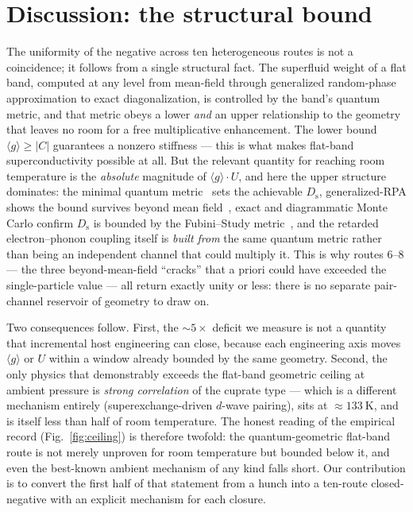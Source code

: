 \documentclass[11pt,a4paper]{article}
\newcommand{\qgg}{\langle g \rangle}
\newcommand{\Ds}{D_{\mathrm{s}}}
\begin{document}
\section{Discussion: the structural bound}
\label{sec:disc}
The uniformity of the negative across ten heterogeneous routes is not a coincidence; it follows from
a single structural fact. The superfluid weight of a flat band, computed at any level from
mean-field through generalized random-phase approximation to exact diagonalization, is controlled by
the band's quantum metric, and that metric obeys a lower \emph{and} an upper relationship to the
geometry that leaves no room for a free multiplicative enhancement. The lower bound
$\qgg \ge |C|$ guarantees a nonzero stiffness --- this is what makes flat-band superconductivity
possible at all. But the relevant quantity for reaching room temperature is the \emph{absolute}
magnitude of $\qgg\!\cdot\!U$, and here the upper structure dominates: the minimal quantum
metric~\citep{huhtinen2022} sets the achievable $\Ds$, generalized-RPA shows the bound survives
beyond mean field~\citep{tam2024}, exact and diagrammatic Monte Carlo confirm $\Ds$ is bounded by
the Fubini--Study metric~\citep{herzog2022}, and the retarded electron--phonon coupling itself is
\emph{built from} the same quantum metric rather than being an independent channel that could
multiply it. This is why routes 6--8 --- the three beyond-mean-field ``cracks'' that a priori could
have exceeded the single-particle value --- all return exactly unity or less: there is no separate
pair-channel reservoir of geometry to draw on.

Two consequences follow. First, the $\sim 5\times$ deficit we measure is not a quantity that
incremental host engineering can close, because each engineering axis moves $\qgg$ or $U$ within a
window already bounded by the same geometry. Second, the only physics that demonstrably exceeds the
flat-band geometric ceiling at ambient pressure is \emph{strong correlation} of the cuprate type ---
which is a different mechanism entirely (superexchange-driven $d$-wave pairing), sits at
$\approx\SI{133}{\kelvin}$, and is itself less than half of room temperature. The honest reading of
the empirical record (Fig.~\ref{fig:ceiling}) is therefore twofold: the quantum-geometric flat-band
route is not merely unproven for room temperature but bounded below it, and even the best-known
ambient mechanism of any kind falls short. Our contribution is to convert the first half of that
statement from a hunch into a ten-route closed-negative with an explicit mechanism for each closure.
\end{document}
